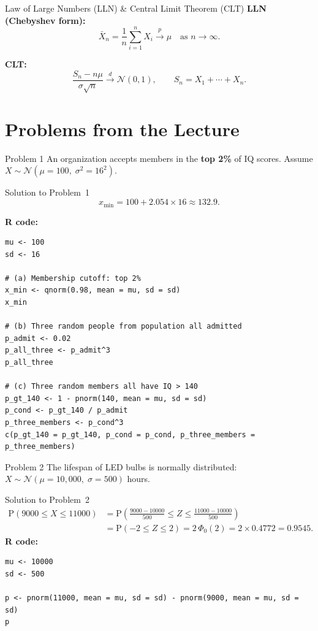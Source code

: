 \documentclass[12pt,a4paper]{article}
\newcommand{\N}{\mathcal{N}}
\renewcommand{\P}{\mathrm{P}}
\begin{document}
\begin{defbox}{Law of Large Numbers (LLN) \& Central Limit Theorem (CLT)}
\textbf{LLN (Chebyshev form):}
\[
\bar X_n=\frac{1}{n}\sum_{i=1}^n X_i\xrightarrow{p}\mu
\quad\text{as }n\to\infty.
\]

\textbf{CLT:}
\[
\frac{S_n-n\mu}{\sigma\sqrt{n}}\xrightarrow{d}\N(0,1),
\qquad S_n=X_1+\cdots+X_n.
\]
\end{defbox}

\bigskip
\section*{\color{kseblue}Problems from the Lecture}

\begin{problembox}{Problem 1}
An organization accepts members in the \textbf{top 2\%} of IQ scores.
Assume $X\sim\N(\mu=100,\;\sigma^2=16^2)$.
\end{problembox}

\begin{solutionbox}{Solution to Problem~1}
\[
x_{\min}=100+2.054\times16\approx132.9.
\]

\textbf{R code:}
\begin{lstlisting}[style=rcode]
mu <- 100
sd <- 16

# (a) Membership cutoff: top 2%
x_min <- qnorm(0.98, mean = mu, sd = sd)
x_min

# (b) Three random people from population all admitted
p_admit <- 0.02
p_all_three <- p_admit^3
p_all_three

# (c) Three random members all have IQ > 140
p_gt_140 <- 1 - pnorm(140, mean = mu, sd = sd)
p_cond <- p_gt_140 / p_admit
p_three_members <- p_cond^3
c(p_gt_140 = p_gt_140, p_cond = p_cond, p_three_members = p_three_members)
\end{lstlisting}
\end{solutionbox}

\vspace{6pt}

\begin{problembox}{Problem 2}
The lifespan of LED bulbs is normally distributed:
$X\sim\N(\mu=10{,}000,\;\sigma=500)$ hours.
\end{problembox}

\begin{solutionbox}{Solution to Problem~2}
\[
\begin{aligned}
\P(9000\le X\le11000)
&=\P\!\left(\frac{9000-10000}{500}\le Z\le\frac{11000-10000}{500}\right)\\
&=\P(-2\le Z\le2)=2\,\Phi_0(2)=2\times0.4772=0.9545.
\end{aligned}
\]
\textbf{R code:}
\begin{lstlisting}[style=rcode]
mu <- 10000
sd <- 500

p <- pnorm(11000, mean = mu, sd = sd) - pnorm(9000, mean = mu, sd = sd)
p
\end{lstlisting}
\end{solutionbox}
\end{document}
